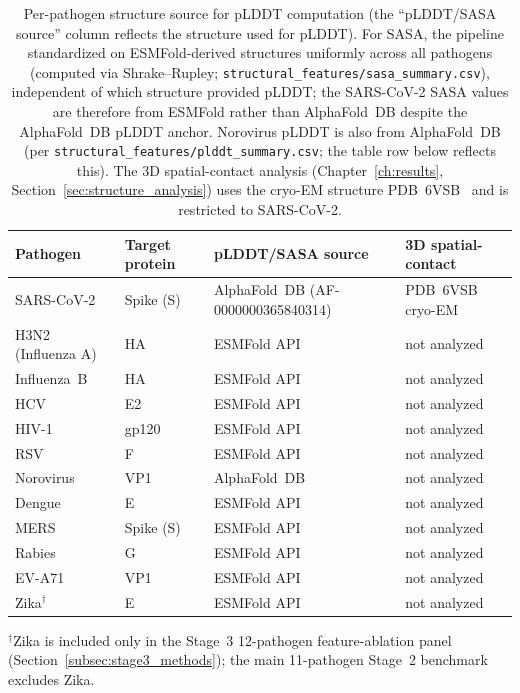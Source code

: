 \begin{table}[htbp]
\centering
\caption{Per-pathogen structure source for pLDDT computation (the ``pLDDT/SASA source'' column reflects the structure used for pLDDT). For SASA, the pipeline standardized on ESMFold-derived structures uniformly across all pathogens (computed via Shrake--Rupley; \texttt{structural\_features/sasa\_summary.csv}), independent of which structure provided pLDDT; the SARS-CoV-2 SASA values are therefore from ESMFold rather than AlphaFold~DB despite the AlphaFold~DB pLDDT anchor. Norovirus pLDDT is also from AlphaFold~DB (per \texttt{structural\_features/plddt\_summary.csv}; the table row below reflects this). The 3D spatial-contact analysis (Chapter~\ref{ch:results}, Section~\ref{sec:structure_analysis}) uses the cryo-EM structure PDB~6VSB~\cite{wrapp2020cryo} and is restricted to SARS-CoV-2.}
\label{tab:structure_sources}
\footnotesize
\begin{tabular}{llll}
\toprule
\textbf{Pathogen} & \textbf{Target protein} & \textbf{pLDDT/SASA source} & \textbf{3D spatial-contact} \\
\midrule
SARS-CoV-2 & Spike (S) & AlphaFold~DB (AF-0000000365840314) & PDB~6VSB cryo-EM \\
H3N2 (Influenza A) & HA & ESMFold API & not analyzed \\
Influenza~B & HA & ESMFold API & not analyzed \\
HCV & E2 & ESMFold API & not analyzed \\
HIV-1 & gp120 & ESMFold API & not analyzed \\
RSV & F & ESMFold API & not analyzed \\
Norovirus & VP1 & AlphaFold~DB & not analyzed \\
Dengue & E & ESMFold API & not analyzed \\
MERS & Spike (S) & ESMFold API & not analyzed \\
Rabies & G & ESMFold API & not analyzed \\
EV-A71 & VP1 & ESMFold API & not analyzed \\
Zika$^{\dagger}$ & E & ESMFold API & not analyzed \\
\bottomrule
\end{tabular}
\begin{minipage}{\textwidth}
\smallskip
\footnotesize $^{\dagger}$Zika is included only in the Stage~3 12-pathogen feature-ablation panel (Section~\ref{subsec:stage3_methods}); the main 11-pathogen Stage~2 benchmark excludes Zika.
\end{minipage}
\end{table}

